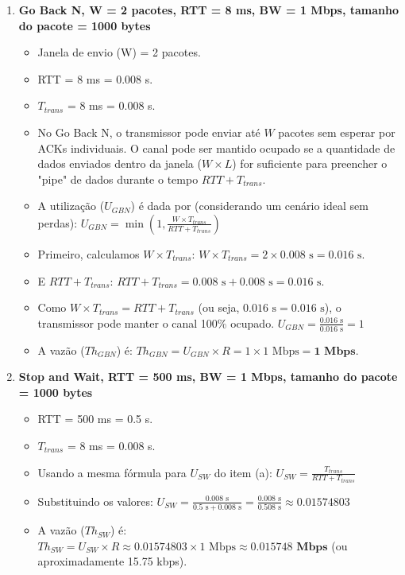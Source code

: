 \begin{enumerate}[label=\alph*.]
    \item \textbf{Go Back N, W = 2 pacotes, RTT = 8 ms, BW = 1 Mbps, tamanho do pacote = 1000 bytes}
    \begin{itemize}
        \item Janela de envio (W) = 2 pacotes.
        \item RTT = 8 ms = 0.008 s.
        \item $T_{trans}$ = 8 ms = 0.008 s.
        \item No Go Back N, o transmissor pode enviar até $W$ pacotes sem esperar por ACKs individuais. O canal pode ser mantido ocupado se a quantidade de dados enviados dentro da janela ($W \times L$) for suficiente para preencher o "pipe" de dados durante o tempo $RTT + T_{trans}$.
        \item A utilização ($U_{GBN}$) é dada por (considerando um cenário ideal sem perdas):
        $U_{GBN} = \min\left(1, \frac{W \times T_{trans}}{RTT + T_{trans}}\right)$
        \item Primeiro, calculamos $W \times T_{trans}$:
        $W \times T_{trans} = 2 \times 0.008 \text{ s} = 0.016 \text{ s}$.
        \item E $RTT + T_{trans}$:
        $RTT + T_{trans} = 0.008 \text{ s} + 0.008 \text{ s} = 0.016 \text{ s}$.
        \item Como $W \times T_{trans} = RTT + T_{trans}$ (ou seja, $0.016 \text{ s} = 0.016 \text{ s}$), o transmissor pode manter o canal 100\% ocupado.
        $U_{GBN} = \frac{0.016 \text{ s}}{0.016 \text{ s}} = 1$
        \item A vazão ($Th_{GBN}$) é:
        $Th_{GBN} = U_{GBN} \times R = 1 \times 1 \text{ Mbps} = \mathbf{1 \text{ Mbps}}$.
    \end{itemize}

    \vspace{0.3cm}

    \item \textbf{Stop and Wait, RTT = 500 ms, BW = 1 Mbps, tamanho do pacote = 1000 bytes}
    \begin{itemize}
        \item RTT = 500 ms = 0.5 s.
        \item $T_{trans}$ = 8 ms = 0.008 s.
        \item Usando a mesma fórmula para $U_{SW}$ do item (a):
        $U_{SW} = \frac{T_{trans}}{RTT + T_{trans}}$
        \item Substituindo os valores:
        $U_{SW} = \frac{0.008 \text{ s}}{0.5 \text{ s} + 0.008 \text{ s}} = \frac{0.008 \text{ s}}{0.508 \text{ s}} \approx 0.01574803$
        \item A vazão ($Th_{SW}$) é:
        $Th_{SW} = U_{SW} \times R \approx 0.01574803 \times 1 \text{ Mbps} \approx \mathbf{0.015748 \text{ Mbps}}$ (ou aproximadamente 15.75 kbps).
    \end{itemize}


\end{enumerate}
